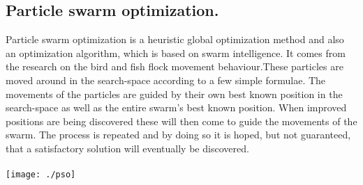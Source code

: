 \subsection{Particle swarm optimization.}Particle swarm optimization is a heuristic global optimization method and also an optimization algorithm, which is based on swarm intelligence. It comes from the research on the bird and fish flock movement behaviour.These particles are moved around in the search-space according to a few simple formulae. The movements of the particles are guided by their own best known position in the search-space as well as the entire swarm's best known position. When improved positions are being discovered these will then come to guide the movements of the swarm. The process is repeated and by doing so it is hoped, but not guaranteed, that a satisfactory solution will eventually be discovered.\\\\
\texttt{[image: ./pso]}\\[1cm]

